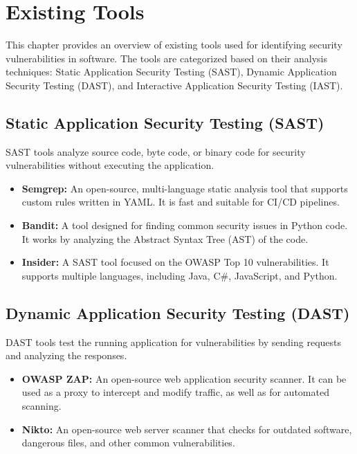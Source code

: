 \chapter{Existing Tools}
\label{chap:tools}
\setlength{\parskip}{1em}

This chapter provides an overview of existing tools used for identifying security vulnerabilities in software. The tools are categorized based on their analysis techniques: Static Application Security Testing (SAST), Dynamic Application Security Testing (DAST), and Interactive Application Security Testing (IAST).

\section{Static Application Security Testing (SAST)}
SAST tools analyze source code, byte code, or binary code for security vulnerabilities without executing the application.

\begin{itemize}
    \item \textbf{Semgrep:} An open-source, multi-language static analysis tool that supports custom rules written in YAML. It is fast and suitable for CI/CD pipelines.
    \item \textbf{Bandit:} A tool designed for finding common security issues in Python code. It works by analyzing the Abstract Syntax Tree (AST) of the code.
    \item \textbf{Insider:} A SAST tool focused on the OWASP Top 10 vulnerabilities. It supports multiple languages, including Java, C#, JavaScript, and Python.
\end{itemize}

\section{Dynamic Application Security Testing (DAST)}
DAST tools test the running application for vulnerabilities by sending requests and analyzing the responses.

\begin{itemize}
    \item \textbf{OWASP ZAP:} An open-source web application security scanner. It can be used as a proxy to intercept and modify traffic, as well as for automated scanning.
    \item \textbf{Nikto:} An open-source web server scanner that checks for outdated software, dangerous files, and other common vulnerabilities.
\end{itemize}

